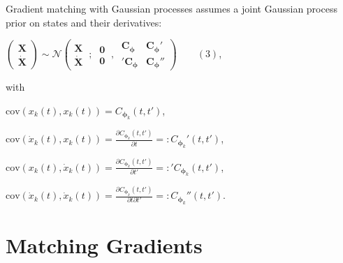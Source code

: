 \begin{par}
Gradient matching with Gaussian processes assumes a joint Gaussian process prior on states and their derivatives:
\end{par} \vspace{1em}
\begin{par}
$\left(\begin{array}{c} \mathbf{X} \\ \dot{\mathbf{X}} \end{array}\right) \sim \mathcal{N} \left(\begin{array}{c} \mathbf{X} \\ \dot{\mathbf{X}} \end{array}~;~\begin{array}{c} \mathbf{0} \\\mathbf{0} \end{array}~,~\begin{array}{cc} \mathbf{C}_{\boldsymbol\phi} & \mathbf{C}_\boldsymbol{\phi}' \\ '\mathbf{C}_{\boldsymbol\phi} & \mathbf{C}_{\boldsymbol\phi}'' \end{array} \right) \qquad (3)$,
\end{par} \vspace{1em}
\begin{par}
with
\end{par} \vspace{1em}
\begin{par}
$\mathrm{cov}(x_k(t), x_k(t)) = C_{\boldsymbol\phi_k}(t,t')$,
\end{par} \vspace{1em}
\begin{par}
$\mathrm{cov}(\dot{x}_k(t), x_k(t)) = \frac{\partial C_{\boldsymbol{\phi}_k}(t,t')}{\partial t} =: C_{{\boldsymbol\phi}_k}'(t,t')$,
\end{par} \vspace{1em}
\begin{par}
$\mathrm{cov}(x_k(t), \dot{x}_k(t)) = \frac{\partial C_{\boldsymbol\phi_k}(t,t')}{\partial t'} =: {'C_{\boldsymbol\phi_k}(t,t')}$,
\end{par} \vspace{1em}
\begin{par}
$\mathrm{cov}(\dot{x}_k(t), \dot{x}_k(t)) = \frac{\partial C_{\boldsymbol\phi_k}(t,t') }{\partial t \partial t'} =: C_{\boldsymbol\phi_k}''(t,t')$.
\end{par} \vspace{1em}


\section{Matching Gradients}

